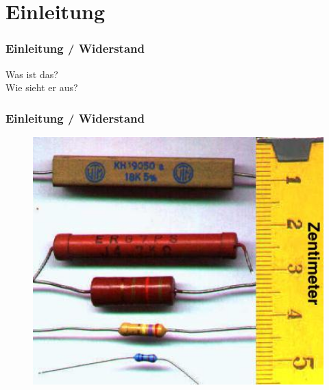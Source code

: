 

\subtitle{Technik Klasse E 04: \\
          Der Widerstand und seine Schaltungsarten \\[2em]}
\date{Stand 27.10.2016}



\section*{Einleitung}

\begin{frame}
    \frametitle{Einleitung / Widerstand}
    \begin{center}
        \Large{Was ist das?} \\
        \Large{Wie sieht er aus?}
    \end{center}
\end{frame}


\begin{frame}
    \frametitle{Einleitung / Widerstand}


  \begin{center}
    \begin{figure}
      \includegraphics[width=1\textwidth,height=.75\textheight,keepaspectratio]{e04/Widerstaende.jpg}
    \end{figure}
  \end{center}

 	

\end{frame}

